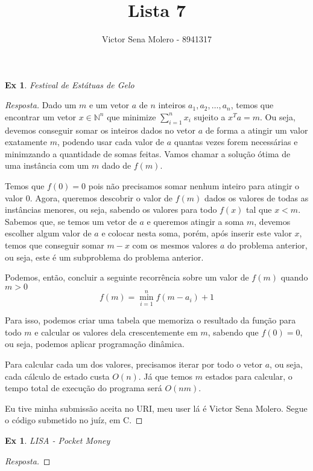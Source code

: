 \documentclass[12pt]{article}
\newcounter{exCounter}
\newtheorem{ex}[exCounter]{Ex}
\begin{document}
 
 
\title{Lista 7}
\author{Victor Sena Molero - 8941317}
\maketitle

\begin{ex}
Festival de Estátuas de Gelo
\end{ex}

\begin{proof}[Resposta]
Dado um $m$ e um vetor $a$ de $n$ inteiros $a_1, a_2, \dots, a_n$, temos que encontrar um vetor $x \in \mathbb{N}^n$ que minimize $\sum\limits_{i=1}^n x_i$ sujeito a $x^Ta = m$. Ou seja, devemos conseguir somar os inteiros dados no vetor $a$ de forma a atingir um valor exatamente $m$, podendo usar cada valor de $a$ quantas vezes forem necessárias e minimzando a quantidade de somas feitas. Vamos chamar a solução ótima de uma instância com um $m$ dado de $f(m)$.

Temos que $f(0) = 0$ pois não precisamos somar nenhum inteiro para atingir o valor 0. Agora, queremos descobrir o valor de $f(m)$ dados os valores de todas as instâncias menores, ou seja, sabendo os valores para todo $f(x)$ tal que $x < m$. Sabemos que, se temos um vetor de $a$ e queremos atingir a soma $m$, devemos escolher algum valor de $a$ e colocar nesta soma, porém, após inserir este valor $x$, temos que conseguir somar $m-x$ com os mesmos valores $a$ do problema anterior, ou seja, este é um subproblema do problema anterior. 

Podemos, então, concluir a seguinte recorrência sobre um valor de $f(m)$ quando $m > 0$
$$ f(m) = \min\limits_{i=1}^{n} f(m-a_i)+1 $$

Para isso, podemos criar uma tabela que memoriza o resultado da função para todo $m$ e calcular os valores dela crescentemente em $m$, sabendo que $f(0) = 0$, ou seja, podemos aplicar programação dinâmica.

Para calcular cada um dos valores, precisamos iterar por todo o vetor $a$, ou seja, cada cálculo de estado custa $O(n)$. Já que temos $m$ estados para calcular, o tempo total de execução do programa será $O(nm)$.

Eu tive minha submissão aceita no URI, meu user lá é Victor Sena Molero. Segue o código submetido no juíz, em C.
\end{proof}

\begin{ex}
LISA - Pocket Money
\end{ex}

\begin{proof}[Resposta]
\end{proof}
\end{document}
